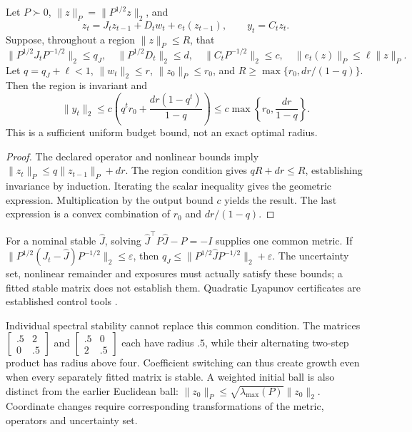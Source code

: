 \begin{proposition}
\label{prop:robust_metric_loss}
Let $P\succ0$, $\|z\|_P=\|P^{1/2}z\|_2$, and
\[
z_t=J_tz_{t-1}+D_tw_t+e_t(z_{t-1}),\qquad y_t=C_tz_t.
\]
Suppose, throughout a region $\|z\|_P\le R$, that
\[
\|P^{1/2}J_tP^{-1/2}\|_2\le q_J,\quad
\|P^{1/2}D_t\|_2\le d,\quad
\|C_tP^{-1/2}\|_2\le c,\quad
\|e_t(z)\|_P\le\ell\|z\|_P.
\]
Let $q=q_J+\ell<1$, $\|w_t\|_2\le r$, $\|z_0\|_P\le r_0$, and $R\ge\max\{r_0,dr/(1-q)\}$. Then the region is invariant and
\[
\|y_t\|_2\le c\left(q^t r_0+\frac{dr(1-q^t)}{1-q}\right)
\le c\max\left\{r_0,\frac{dr}{1-q}\right\}.
\]
This is a sufficient uniform budget bound, not an exact optimal radius.
\end{proposition}
\begin{proof}
The declared operator and nonlinear bounds imply $\|z_t\|_P\le q\|z_{t-1}\|_P+dr$. The region condition gives $qR+dr\le R$, establishing invariance by induction. Iterating the scalar inequality gives the geometric expression. Multiplication by the output bound $c$ yields the result. The last expression is a convex combination of $r_0$ and $dr/(1-q)$.
\end{proof}
For a nominal stable $\widehat J$, solving $\widehat J^\top P\widehat J-P=-I$ supplies one common metric. If
$\|P^{1/2}(J_t-\widehat J)P^{-1/2}\|_2\le\varepsilon$, then $q_J\le\|P^{1/2}\widehat JP^{-1/2}\|_2+\varepsilon$. The uncertainty set, nonlinear remainder and exposures must actually satisfy these bounds; a fitted stable matrix does not establish them. Quadratic Lyapunov certificates are established control tools \citep{boyd1994lmi}.

Individual spectral stability cannot replace this common condition. The matrices $\left[\begin{smallmatrix}.5&2\\0&.5\end{smallmatrix}\right]$ and $\left[\begin{smallmatrix}.5&0\\2&.5\end{smallmatrix}\right]$ each have radius $.5$, while their alternating two-step product has radius above four. Coefficient switching can thus create growth even when every separately fitted matrix is stable. A weighted initial ball is also distinct from the earlier Euclidean ball: $\|z_0\|_P\le\sqrt{\lambda_{\max}(P)}\|z_0\|_2$. Coordinate changes require corresponding transformations of the metric, operators and uncertainty set.

